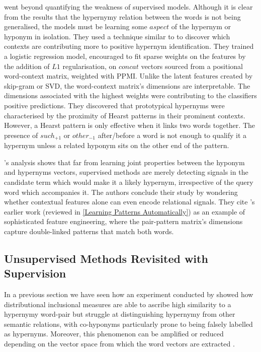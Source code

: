\citeauthor{levy2015supervised} went beyond quantifying the weakness of supervised models.  Although it is clear from the results that the hypernymy relation between the words is not being generalised, the models must be learning some $aspect$ of the hypernym or hyponym in isolation.  They used a technique similar to \citep{roller2014inclusive} to discover which contexts are contributing more to positive hypernym identification.  They trained a logistic regression model, encouraged to fit sparse weights on the features by the addition of $L1$ regularisation, on $concat$ vectors sourced from a positional word-context matrix, weighted with \ac{PPMI}.  Unlike the latent features created by skip-gram or \ac{SVD}, the word-context matrix’s dimensions are interpretable.  The dimensions associated with the highest weights were contributing to the classifiers positive predictions.  They discovered that prototypical hypernyms were characterised by the proximity of Hearst patterns \citep{hearst1992automatic} in their prominent contexts.  However, a Hearst pattern is only effective when it links two words together.  The presence of $such_{+1}$ or $other_{-1}$ after/before a word is not enough to qualify it a hypernym unless a related hyponym sits on the other end of the pattern.

\citeauthor{levy2015supervised}'s analysis shows that far from learning joint properties between the hyponym and hypernyms vectors, supervised methods are merely detecting signals in the candidate term which would make it a likely hypernym, irrespective of the query word which accompanies it.  The authors conclude their study by wondering whether contextual features alone can even encode relational signals.  They cite \citet{Snow2004}'s earlier work (reviewed in \ref{Learning Patterns Automatically}) as an example of sophisticated feature engineering, where the pair-pattern matrix’s dimensions capture double-linked patterns that match both words.

\subsection{Unsupervised Methods Revisited with Supervision}
In a previous section we have seen how an experiment conducted by \citeauthor{roller2014inclusive} showed how distributional inclusional measures are able to ascribe high similarity to a hypernymy word-pair but struggle at distinguishing hypernymy from other semantic relations, with co-hyponyms particularly prone to being falsely labelled as hypernyms.  Moreover, this phenomenon can be amplified or reduced depending on the vector space from which the word vectors are extracted \citep{roller2014inclusive}.

